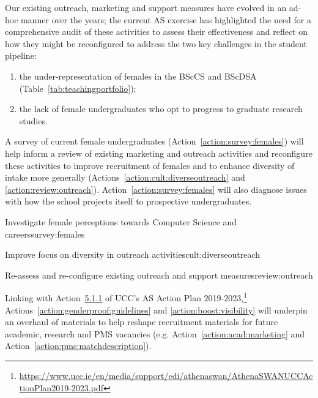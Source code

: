 Our existing outreach, marketing and support measures
have evolved in an ad-hoc manner over the years; the 
current AS exercise has highlighted the need for
a comprehensive audit of these activities 
to assess their effectiveness and reflect on how they might 
be reconfigured to address the two key challenges in the 
student pipeline:
\begin{enumerate}[noitemsep]
\item  the under-representation of females in the BScCS and BScDSA 
(Table~\ref{tab:teachingportfolio}); 
\item the lack of female undergraduates who opt to 
progress to graduate research studies.
\end{enumerate}

A survey of current female undergraduates 
(Action~\ref{action:survey:females}) will help inform a 
review of existing marketing and outreach
activities and reconfigure these activities to improve
recruitment of females and to enhance diversity of intake
more generally (Actions~\ref{action:cult:diverseoutreach}
and \ref{action:review:outreach}).
Action~\ref{action:survey:females} will also  diagnose issues
with how the school projects itself to prospective undergraduates.


\begin{actionblock}{\ksspace{}Investigate female perceptions towards
Computer Science and careers}{survey:females}
\actsurveyugfemales
\hfill{
    \hypersetup{hidelinks}
    \hyperlink{b0}{\gotoactionsymbol{}}
}
\end{actionblock}



\begin{actionblock}{\ksspace{}Improve focus on diversity in outreach activities}{cult:diverseoutreach}
\actreviseoutreachpractice
\hfill{
    \hypersetup{hidelinks}
    \hyperlink{b6}{\gotoactionsymbol{}}
}
\end{actionblock}

\begin{actionblock}{\ksspace{}Re-assess and re-configure
existing outreach and support measures}{review:outreach}
\actreviewactivities
\hfill{
    \hypersetup{hidelinks}
    \hyperlink{b2}{\gotoactionsymbol{}}
}
\end{actionblock}



Linking with Action~\hyperlink{act511}{5.1.1}
of UCC's AS Action Plan 2019-2023,\footnote{\url{https://www.ucc.ie/en/media/support/edi/athenaswan/AthenaSWANUCCActionPlan2019-2023.pdf}}
Actions~\ref{action:genderproof:guidelines} 
and \ref{action:boost:visibility} 
will underpin  an overhaul of materials to help reshape recruitment 
materials for future academic, research and PMS vacancies 
(e.g. Action~\ref{action:acad:marketing} and 
Action~\ref{action:pms:matchdescription}).

